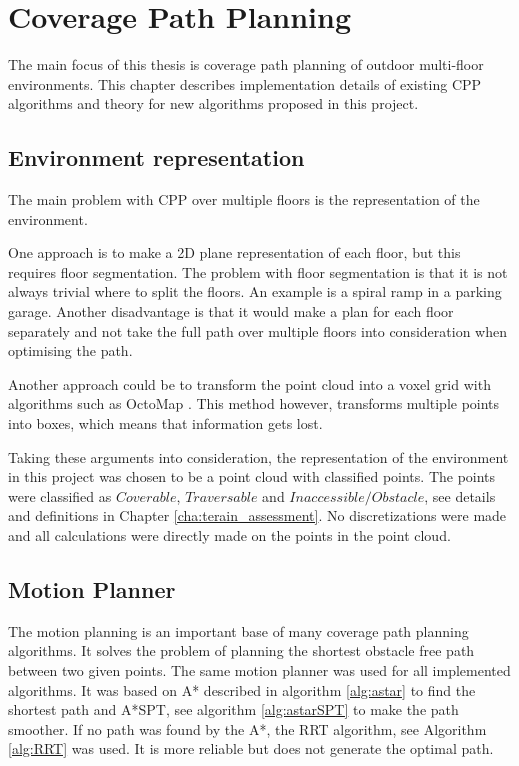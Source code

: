 \chapter{Coverage Path Planning}
\label{cha:cpp}

The main focus of this thesis is coverage path planning of outdoor multi-floor environments. This chapter describes implementation details of existing CPP algorithms and theory for new algorithms proposed in this project.

\section{Environment representation}
The main problem with CPP over multiple floors is the representation of the environment. 

One approach is to make a 2D plane representation of each floor, but this requires floor segmentation. The problem with floor segmentation is that it is not always trivial where to split the floors. An example is a spiral ramp in a parking garage. Another disadvantage is that it would make a plan for each floor separately and not take the full path over multiple floors into consideration when optimising the path. 

Another approach could be to transform the point cloud into a voxel grid with algorithms such as OctoMap \cite{octomap}. This method however, transforms multiple points into boxes, which means that information gets lost. 

Taking these arguments into consideration, the representation of the environment in this project was chosen to be a point cloud with classified points. The points were classified as $Coverable$, $Traversable$ and $Inaccessible/Obstacle$, see details and definitions in Chapter \ref{cha:terain_assessment}. No discretizations were made and all calculations were directly made on the points in the point cloud.

\section{Motion Planner}
 \label{sec:motion_planner}
The motion planning is an important base of many coverage path planning algorithms. It solves the problem of planning the shortest obstacle free path between two given points. The same motion planner was used for all implemented algorithms. It was based on A* described in algorithm \ref{alg:astar} to find the shortest path and A*SPT, see algorithm \ref{alg:astarSPT} to make the path smoother. If no path was found by the A*, the RRT algorithm, see Algorithm \ref{alg:RRT} was used. It is more reliable but does not generate the optimal path. 

